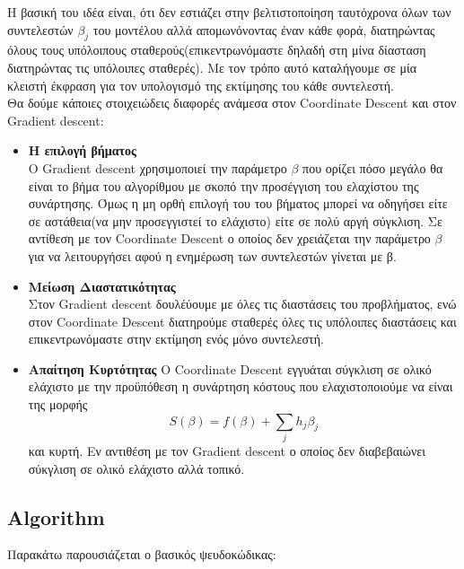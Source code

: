 \documentclass[12pt]{article}
\begin{document}
Η βασική του ιδέα  είναι, ότι δεν εστιάζει στην βελτιστοποίηση ταυτόχρονα όλων των συντελεστών $\beta_j$ του μοντέλου αλλά απομωνόνοντας έναν κάθε φορά, διατηρώντας όλους τους υπόλοιπους σταθερούς(επικεντρωνόμαστε δηλαδή στη μίνα δίασταση διατηρώντας τις υπόλοιπες σταθερές). Με τον τρόπο αυτό καταλήγουμε σε μία κλειστή έκφραση για τον υπολογισμό της εκτίμησης του κάθε συντελεστή.\\

Θα δούμε κάποιες στοιχειώδεις διαφορές ανάμεσα στον \textlatin{Coordinate Descent} και στον \textlatin{Gradient descent}:
\begin{itemize}
    \item \textbf{Η επιλογή βήματος}\\
    Ο \textlatin{Gradient descent} χρησιμοποιεί την παράμετρο $\beta$ που ορίζει πόσο μεγάλο θα είναι το βήμα του αλγορίθμου με σκοπό την προσέγγιση του ελαχίστου της συνάρτησης. Όμως η μη ορθή επιλογή του του βήματος μπορεί να οδηγήσει είτε σε αστάθεια(να μην προσεγγιστεί το ελάχιστο) είτε σε πολύ αργή σύγκλιση. Σε αντίθεση με τον \textlatin{Coordinate Descent} ο οποίος δεν χρειάζεται την παράμετρο $\beta$ για να λειτουργήσει αφού η ενημέρωση των συντελεστών γίνεται με β.
    \item \textbf{Μείωση Διαστατικότητας}\\
    Στον \textlatin{Gradient descent} δουλέύουμε με όλες τις διαστάσεις του προβλήματος, ενώ στον \textlatin{Coordinate Descent} διατηρούμε σταθερές όλες τις υπόλοιπες διαστάσεις και επικεντρωνόμαστε στην εκτίμηση ενός μόνο συντελεστή.
    \item\textbf{Απαίτηση Κυρτότητας}
    Ο \textlatin{Coordinate Descent} εγγυάται σύγκλιση σε ολικό ελάχιστο με την προϋπόθεση η συνάρτηση κόστους που ελαχιστοποιούμε να είναι της μορφής \[S(\beta) = f(\beta) + \sum_{j} h_j\beta_j\] και κυρτή. Εν αντιθέση με τον \textlatin{Gradient descent} ο οποίος δεν διαβεβαιώνει σύκγλιση σε ολικό ελάχιστο αλλά τοπικό. 
\end{itemize}

\newpage
\subsection{\textlatin{Algorithm}}
Παρακάτω παρουσιάζεται ο βασικός ψευδοκώδικας:

\end{document}
